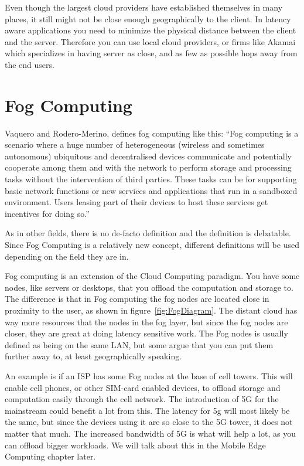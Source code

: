 Even though the largest cloud providers have established themselves in many places, it still might not be close enough geographically to the client. In latency aware applications you need to minimize the physical distance between the client and the server. Therefore you can use local cloud providers, or firms like Akamai which specializes in having server as close, and as few as possible hops away from the end users.










\section{Fog Computing}

Vaquero and Rodero-Merino\cite{vaquero_finding_2014}, defines fog computing like this: 
“Fog computing is a scenario where a huge number of heterogeneous (wireless and sometimes autonomous) ubiquitous and decentralised devices communicate and potentially cooperate among them and with the network to perform storage and processing tasks without the intervention of third parties. These tasks can be for supporting basic network functions or new services and applications that run in a sandboxed environment. Users leasing part of their devices to host these services get incentives for doing so.”

As in other fields, there is no de-facto definition and the definition is debatable. Since Fog Computing is a relatively new concept, different definitions will be used depending on the field they are in.

Fog computing is an extension of the Cloud Computing paradigm. You have some nodes, like servers or desktops, that you offload the computation and storage to. The difference is that in Fog computing the fog nodes are located close in proximity to the user\cite{msftadmin_concept_2020}, as shown in figure~\ref{fig:FogDiagram}. The distant cloud has way more resources that the nodes in the fog layer, but since the fog nodes are closer, they are great at doing latency sensitive work. The Fog nodes is usually defined as being on the same LAN, but some argue that you can put them further away to, at least geographically speaking. 

An example is if an ISP has some Fog nodes at the base of cell towers. This will enable cell phones, or other SIM-card enabled devices, to offload storage and computation easily through the cell network. The introduction of 5G for the mainstream could benefit a lot from this. The latency for 5g will most likely be the same, but since the devices using it are so close to the 5G tower, it does not matter that much. The increased bandwidth of 5G is what will help a lot, as you can offload bigger workloads. We will talk about this in the Mobile Edge Computing chapter later. 

